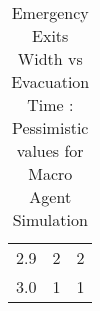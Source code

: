 \begin{table}[H]
{\begin{tabular}{|l|l|l|}
2.9                      & 2                                                                                                                   & 2                                                                                                                  \\
3.0                      & 1                                                                                                                   & 1                                                                                                                  \\
\hline
\end{tabular}}
\caption{Emergency Exits Width vs Evacuation Time : Pessimistic values for Macro Agent Simulation}
\label{Emergency Exits Width vs Evacuation Time : Pessimistic values for Macro Agent Simulation}
\end{table}



